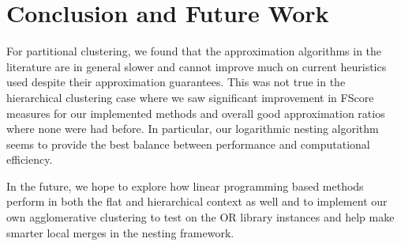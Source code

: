 \documentclass{article}
\begin{document}
\section{Conclusion and Future Work}
For partitional clustering, we found that the approximation algorithms in the literature are in general slower and cannot improve much on current heuristics used despite their approximation guarantees. This was not true in the hierarchical clustering case where we saw significant improvement in FScore measures for our implemented methods and overall good approximation ratios where none were had before. In particular, our logarithmic nesting algorithm seems to provide the best balance between performance and computational efficiency.

In the future, we hope to explore how linear programming based methods perform in both the flat and hierarchical context as well and to implement our own agglomerative clustering to test on the OR library instances and help make smarter local merges in the nesting framework.


\label{submission}




\end{document}
